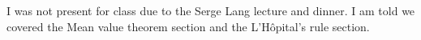 \documentclass[../notes.tex]{subfiles}
\begin{document}
I was not present for class due to the Serge Lang lecture and dinner. I am told we covered the Mean value theorem section and the L'H\^opital's rule section.
\end{document}
